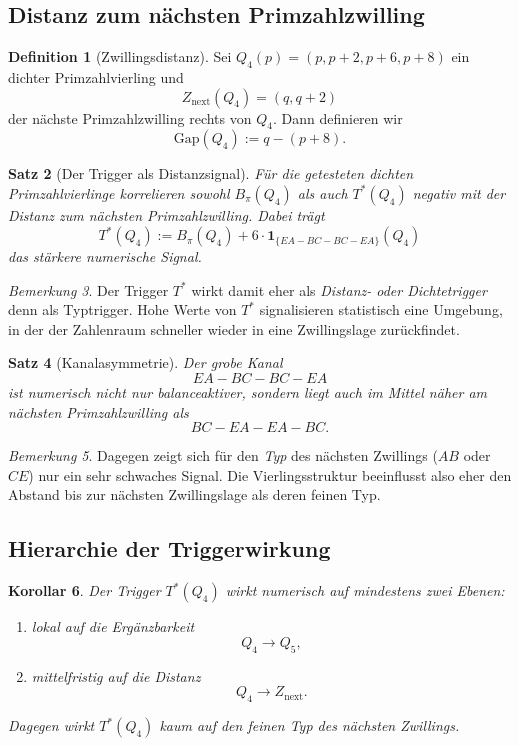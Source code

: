 \documentclass[11pt,a4paper]{article}
\theoremstyle{plain}
\newtheorem{satz}{Satz}[section]
\newtheorem{korollar}[satz]{Korollar}
\theoremstyle{definition}
\newtheorem{definition}[satz]{Definition}
\theoremstyle{remark}
\newtheorem{bemerkung}[satz]{Bemerkung}
\newcommand{\Gap}{\mathrm{Gap}}
\newcommand{\1}{\mathbf{1}}
\begin{document}
	\subsection{Distanz zum nächsten Primzahlzwilling}
	
	\begin{definition}[Zwillingsdistanz]
		\label{def:gap}
		Sei \(Q_4(p)=(p,p+2,p+6,p+8)\) ein dichter Primzahlvierling und
		\[
		Z_{\mathrm{next}}(Q_4)=(q,q+2)
		\]
		der nächste Primzahlzwilling rechts von \(Q_4\). Dann definieren wir
		\[
		\Gap(Q_4):=q-(p+8).
		\]
	\end{definition}
	
	\begin{satz}[Der Trigger als Distanzsignal]
		\label{satz:distanzsignal}
		Für die getesteten dichten Primzahlvierlinge korrelieren sowohl \(B_\pi(Q_4)\) als auch \(T^*(Q_4)\) negativ mit der Distanz zum nächsten Primzahlzwilling. Dabei trägt
		\[
		T^*(Q_4):=B_\pi(Q_4)+6\cdot \mathbf{1}_{\{EA-BC-BC-EA\}}(Q_4)
		\]
		das stärkere numerische Signal.
	\end{satz}
	
	\begin{bemerkung}
		Der Trigger \(T^*\) wirkt damit eher als \emph{Distanz- oder Dichtetrigger} denn als Typtrigger. Hohe Werte von \(T^*\) signalisieren statistisch eine Umgebung, in der der Zahlenraum schneller wieder in eine Zwillingslage zurückfindet.
	\end{bemerkung}
	
	\begin{satz}[Kanalasymmetrie]
		\label{satz:kanalasymmetrie}
		Der grobe Kanal
		\[
		EA-BC-BC-EA
		\]
		ist numerisch nicht nur balanceaktiver, sondern liegt auch im Mittel näher am nächsten Primzahlzwilling als
		\[
		BC-EA-EA-BC.
		\]
	\end{satz}
	
	\begin{bemerkung}
		Dagegen zeigt sich für den \emph{Typ} des nächsten Zwillings (\(AB\) oder \(CE\)) nur ein sehr schwaches Signal. Die Vierlingsstruktur beeinflusst also eher den Abstand bis zur nächsten Zwillingslage als deren feinen Typ.
	\end{bemerkung}
	
	\subsection{Hierarchie der Triggerwirkung}
	
	\begin{korollar}
		\label{kor:hierarchie}
		Der Trigger \(T^*(Q_4)\) wirkt numerisch auf mindestens zwei Ebenen:
		\begin{enumerate}[label=(\roman*)]
			\item lokal auf die Ergänzbarkeit
			\[
			Q_4\to Q_5,
			\]
			\item mittelfristig auf die Distanz
			\[
			Q_4\to Z_{\mathrm{next}}.
			\]
		\end{enumerate}
		Dagegen wirkt \(T^*(Q_4)\) kaum auf den feinen Typ des nächsten Zwillings.
	\end{korollar}
	
\end{document}

